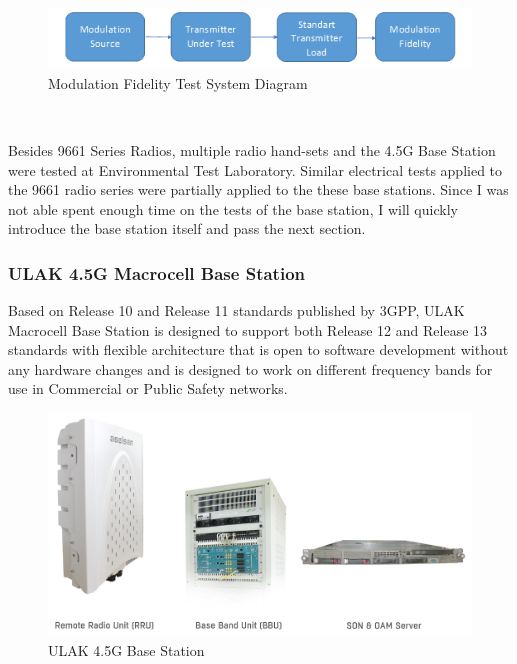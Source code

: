	
\begin{figure}[H]
	\center
	\setlength{\unitlength}{\textwidth} 
	\includegraphics[width=1.0\unitlength]{modfide}
	\caption{\label{fig:modfide}Modulation Fidelity Test System Diagram }
\end{figure}



\- \\[1.5cm] \- \vfill


	Besides 9661 Series Radios, multiple radio hand-sets and the 4.5G Base Station were tested at Environmental Test Laboratory. Similar electrical tests applied to the 9661 radio series were partially applied to the these base stations. Since I was not able spent enough time on the tests of the base station, I will quickly introduce the base station itself and pass the next section. 

\subsubsection{ULAK 4.5G Macrocell Base Station}
\- \indent
	Based on Release 10 and Release 11 standards published by 3GPP, ULAK Macrocell Base Station is designed to support both Release 12 and Release 13 standards with flexible architecture that is open to software development without any hardware changes and is designed to work on different frequency bands for use in Commercial or Public Safety networks\cite{ulak}.  

\begin{figure}[H]
	\center
	\setlength{\unitlength}{\textwidth} 
	\includegraphics[width=1.0\unitlength]{ulak}
	\caption{\label{fig:ulak}ULAK 4.5G Base Station\cite{ulak} }
\end{figure}	
	
